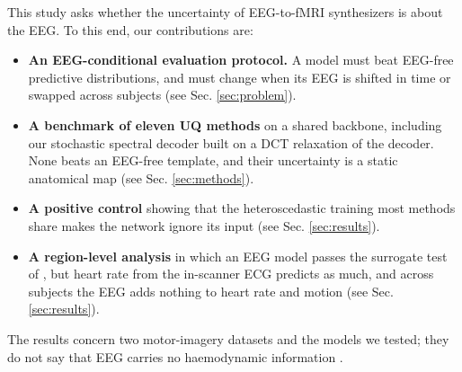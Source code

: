 This study asks whether the uncertainty of EEG-to-fMRI synthesizers is about the EEG. To this end, our contributions are:
\begin{itemize}
	\item \textbf{An EEG-conditional evaluation protocol.} A model must beat EEG-free predictive distributions, and must change when its EEG is shifted in time or swapped across subjects (see Sec. \ref{sec:problem}).
	\item \textbf{A benchmark of eleven UQ methods} on a shared backbone, including our stochastic spectral decoder built on a DCT relaxation of the decoder. None beats an EEG-free template, and their uncertainty is a static anatomical map (see Sec. \ref{sec:methods}).
	\item \textbf{A positive control} showing that the heteroscedastic training most methods share makes the network ignore its input (see Sec. \ref{sec:results}).
	\item \textbf{A region-level analysis} in which an EEG model passes the surrogate test of \citet{mehta2025eegbold}, but heart rate from the in-scanner ECG predicts as much, and across subjects the EEG adds nothing to heart rate and motion (see Sec. \ref{sec:results}).
\end{itemize}
The results concern two motor-imagery datasets and the models we tested; they do not say that EEG carries no haemodynamic information \citep{goldman2002simultaneous,laufs2003eeg}.
